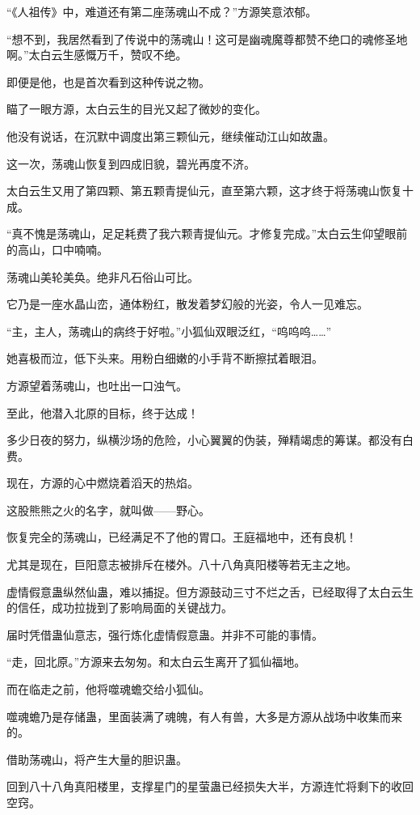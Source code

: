 \begin{this_body}
“《人祖传》中，难道还有第二座荡魂山不成？”方源笑意浓郁。

“想不到，我居然看到了传说中的荡魂山！这可是幽魂魔尊都赞不绝口的魂修圣地啊。”太白云生感慨万千，赞叹不绝。

即便是他，也是首次看到这种传说之物。

瞄了一眼方源，太白云生的目光又起了微妙的变化。

他没有说话，在沉默中调度出第三颗仙元，继续催动江山如故蛊。

这一次，荡魂山恢复到四成旧貌，碧光再度不济。

太白云生又用了第四颗、第五颗青提仙元，直至第六颗，这才终于将荡魂山恢复十成。

“真不愧是荡魂山，足足耗费了我六颗青提仙元。才修复完成。”太白云生仰望眼前的高山，口中喃喃。

荡魂山美轮美奂。绝非凡石俗山可比。

它乃是一座水晶山峦，通体粉红，散发着梦幻般的光姿，令人一见难忘。

“主，主人，荡魂山的病终于好啦。”小狐仙双眼泛红，“呜呜呜……”

她喜极而泣，低下头来。用粉白细嫩的小手背不断擦拭着眼泪。

方源望着荡魂山，也吐出一口浊气。

至此，他潜入北原的目标，终于达成！

多少日夜的努力，纵横沙场的危险，小心翼翼的伪装，殚精竭虑的筹谋。都没有白费。

现在，方源的心中燃烧着滔天的热焰。

这股熊熊之火的名字，就叫做——野心。

恢复完全的荡魂山，已经满足不了他的胃口。王庭福地中，还有良机！

尤其是现在，巨阳意志被排斥在楼外。八十八角真阳楼等若无主之地。

虚情假意蛊纵然仙蛊，难以捕捉。但方源鼓动三寸不烂之舌，已经取得了太白云生的信任，成功拉拢到了影响局面的关键战力。

届时凭借蛊仙意志，强行炼化虚情假意蛊。并非不可能的事情。

“走，回北原。”方源来去匆匆。和太白云生离开了狐仙福地。

而在临走之前，他将噬魂蟾交给小狐仙。

噬魂蟾乃是存储蛊，里面装满了魂魄，有人有兽，大多是方源从战场中收集而来的。

借助荡魂山，将产生大量的胆识蛊。

回到八十八角真阳楼里，支撑星门的星萤蛊已经损失大半，方源连忙将剩下的收回空窍。


\end{this_body}
